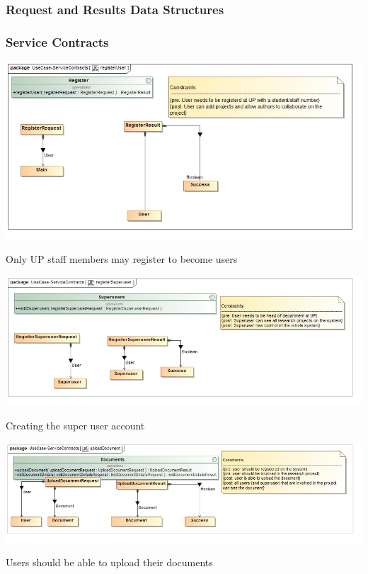 \documentclass[a4paper,12pt]{report}
\begin{document}
\subsubsection{Request and Results Data Structures}
\subsubsection{Service Contracts}
\begin{flushleft}
	\includegraphics[scale=0.5]{./images/class__registerUser.jpg}
	\begin{center}
		Only UP staff members may register to become users
	\end{center}
\end{flushleft}

\begin{flushleft}
	\includegraphics[scale=0.5]{./images/class__registerSuperuser.jpg}
	\begin{center}
		Creating the super user account
	\end{center}
\end{flushleft}

\newpage

\begin{flushleft}
	\includegraphics[scale=0.5]{./images/class__uploadDocument.jpg}
	\begin{center}
		Users should be able to upload their documents
	\end{center}
\end{flushleft}
\end{document}
